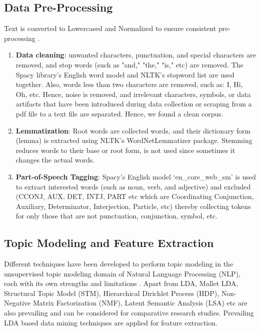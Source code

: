 \documentclass[sn-mathphys,Numbered]{sn-jnl}%
\theoremstyle{thmstyleone}%
\theoremstyle{thmstyletwo}%
\theoremstyle{thmstylethree}%
\begin{document}
\subsection{Data Pre-Processing}\label{data_pre} 
Text is converted to Lowercased and Normalized to ensure consistent pre-processing \cite{kao_natural_2007}. \begin{enumerate}[label=(\roman*)] \item \textbf{Data cleaning}: unwanted characters, punctuation, and special characters are removed, and stop words (such as "and," "the," "is," etc) are removed. The Spacy library's English word model and NLTK's stopword list are used together. Also, words less than two characters are removed, such as: I, Hi, Oh, etc. Hence, noise is removed, and irrelevant characters, symbols, or data artifacts that have been introduced during data collection or scraping from a pdf file to a text file are separated. Hence, we found a clean corpus. \item \textbf{Lemmatization}: Root words are collected words, and their dictionary form (lemma) is extracted using NLTK's WordNetLemmatizer package. Stemming reduces words to their base or root form, is not used since sometimes it changes the actual words. \item \textbf{Part-of-Speech Tagging}: Spacy's English model `en\_core\_web\_sm' is used to extract interested words (such as noun, verb, and adjective) and excluded (CCONJ, AUX, DET, INTJ, PART etc which are Coordinating Conjunction, Auxiliary, Determinator, Interjection, Particle, etc) thereby collecting tokens for only those that are not punctuation, conjunction, symbol, etc. \end{enumerate} \subsection{Topic Modeling and Feature Extraction}\label{top_mod_feature} Different techniques have been developed to perform topic modeling in the unsupervised topic modeling domain of Natural Language Processing (NLP), each with its own strengths and limitations \cite{vayansky2020review, abdelrazek2022topic, yi2009comparative}. Apart from LDA, Mallet LDA, Structural Topic Model (STM), Hierarchical Dirichlet Process (HDP), Non-Negative Matrix Factorization (NMF), Latent Semantic Analysis (LSA) etc are also prevailing and can be considered for comparative research studies. Prevailing LDA based data mining techniques are applied for feature extraction. 
\end{document}
